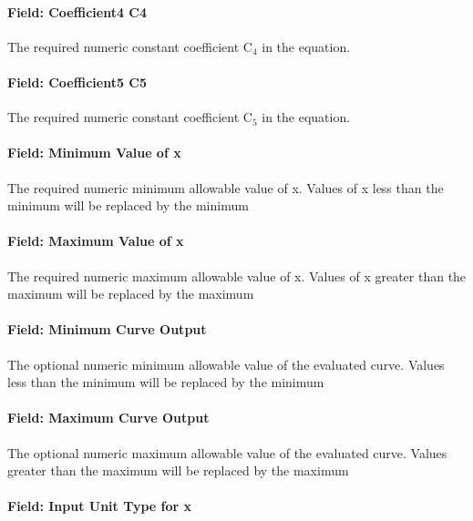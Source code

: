 \paragraph{Field: Coefficient4 C4}\label{field-coefficient4-c4-2}

The required numeric constant coefficient C\(_{4}\) in the equation.

\paragraph{Field: Coefficient5 C5}\label{field-coefficient5-c5-1}

The required numeric constant coefficient C\(_{5}\) in the equation.

\paragraph{Field: Minimum Value of x}\label{field-minimum-value-of-x-17}

The required numeric minimum allowable value of x. Values of x less than the minimum will be replaced by the minimum

\paragraph{Field: Maximum Value of x}\label{field-maximum-value-of-x-18}

The required numeric maximum allowable value of x. Values of x greater than the maximum will be replaced by the maximum

\paragraph{Field: Minimum Curve Output}\label{field-minimum-curve-output-17}

The optional numeric minimum allowable value of the evaluated curve. Values less than the minimum will be replaced by the minimum

\paragraph{Field: Maximum Curve Output}\label{field-maximum-curve-output-16}

The optional numeric maximum allowable value of the evaluated curve. Values greater than the maximum will be replaced by the maximum

\paragraph{Field: Input Unit Type for x}\label{field-input-unit-type-for-x-17}

